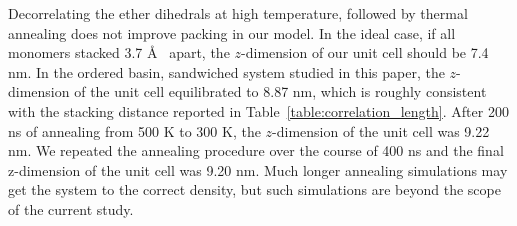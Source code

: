 \documentclass[journal=jpcbfk,manuscript=article]{achemso}
\begin{document}
  Decorrelating the ether dihedrals at high temperature, followed by thermal annealing
  does not improve packing in our model. In the ideal case, if all monomers stacked 
  3.7 \AA~ apart, the $z$-dimension of our unit cell should be 7.4 nm. In the ordered basin, 
  sandwiched system studied in this paper, the $z$-dimension of the unit cell equilibrated 
  to 8.87 nm, which is roughly consistent with the stacking distance reported in 
  Table~\ref{table:correlation_length}. After 200 ns of annealing from 500 K to 300 K, the 
  $z$-dimension of the unit cell was 9.22 nm. We repeated the annealing procedure over the 
  course of 400 ns and the final z-dimension of the unit cell was 9.20 nm. Much longer
  annealing simulations may get the system to the correct density, but such simulations are beyond
  the scope of the current study.
\end{document}
